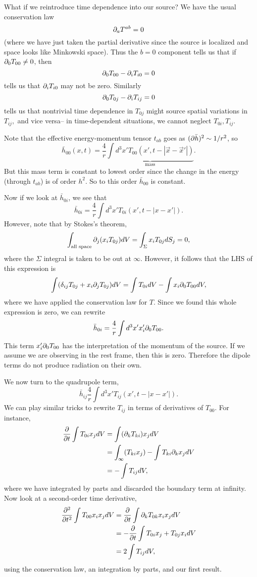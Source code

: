 What if we reintroduce time dependence into our source? We have the usual conservation law
$$\partial_a T^{ab}=0$$
(where we have just taken the partial derivative since the source is localized and space looks like Minkowski space). Thus the $b=0$ component tells us that if $\partial_0 T_{00}\neq 0$, then
$$\partial_0 T_{00}-\partial_i T_{i0}=0$$
tells us that $\partial_i T_{i0}$ may not be zero. Similarly $$\partial_0 T_{0j} -\partial_i T_{ij}=0$$
tells us that nontrivial time dependence in $T_{0j}$ might source spatial variations in $T_{ij},$ and vice versa-- in time-dependent situations, we cannot neglect $T_{0i},T_{ij}$.

Note that the effective energy-momentum tensor $t_{ab}$ goes as $(\partial\bar h)^2 \sim 1/r^2$, so
$$\bar h_{00}(x,t)=\frac{4}{r} \underbrace{\int d^3 x' T_{00}(x',t-|\vec x-\vec x'|)}_{\text{mass}}.$$
But this mass term is constant to lowest order since the change in the energy (through $t_{ab}$) is of order $h^2$. So to this order $\bar h_{00}$ is constant.

Now if we look at $\bar h_{0i}$, we see that
$$\bar h_{0i}=\frac{4}{r}\int d^3 x' T_{0i}(x',t-|x-x'|).$$
However, note that by Stokes's theorem,
$$\int_{\text{all space}} \partial_j(x_i T_{0j})dV= \int_\Sigma x_i T_{0j}dS_j =0,$$
where the $\Sigma$ integral is taken to be out at $\infty$. However, it follows that the LHS of this expression is
$$\int (\delta_{ij}T_{0j}+x_i \partial_j T_{0j})dV = \int T_{0i}dV- \int x_i \partial_0 T_{00} dV,$$
where we have applied the conservation law for $T.$ Since we found this whole expression is zero, we can rewrite
$$\bar h_{0i}=\frac{4}{r}\int d^3x' x_i' \partial_0 T_{00}.$$
This term $x_i' \partial_0 T_{00}$ has the interpretation of the momentum of the source. If we assume we are observing in the rest frame, then this is zero. Therefore the dipole terms do not produce radiation on their own.

We now turn to the quadrupole term,
$$\bar h_{ij} \frac{4}{r} \int d^3 x' T_{ij}(x',t-|x-x'|).$$
We can play similar tricks to rewrite $T_{ij}$ in terms of derivatives of $T_{00}$. For instance,
\begin{align*}
    \frac{\partial }{\partial t}\int T_{0i}x_j dV &= \int (\partial_k T_{ki})x_j dV\\
    &= \int_\infty (T_{ki}x_j)-\int T_{ki} \partial_k x_j dV\\
    &= -\int T_{ij}dV,
\end{align*}
where we have integrated by parts and discarded the boundary term at infinity.
Now look at a second-order time derivative,
\begin{align*}
    \frac{\partial^2}{\partial t^2}\int T_{00} x_i x_j dV &= \frac{\partial }{\partial t}\int \partial_k T_{0k}x_i x_j dV\\
    &= -\frac{\partial }{\partial t}\int T_{0i}x_j + T_{0j}x_i dV\\
    &=2\int T_{ij} dV,
\end{align*}
using the conservation law, an integration by parts, and our first result.

